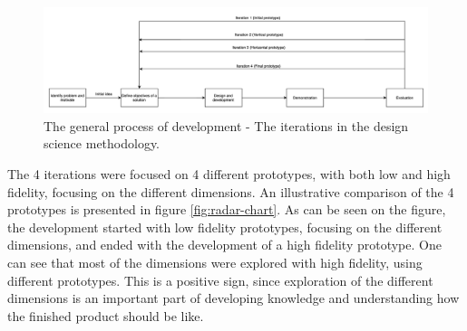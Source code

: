 \documentclass[pdftex,10pt,b5paper,twoside]{report}
\begin{document}
\begin{figure}[h!]
    \centering
    \includegraphics[width=\linewidth]{../images/workflow.png}
    \caption{The general process of development - The iterations in the design science methodology.}
    \label{fig:workflow}
\end{figure}

The 4 iterations were focused on 4 different prototypes, with both low and high fidelity, focusing on the different dimensions. An illustrative comparison of the 4 prototypes is presented in figure \ref{fig:radar-chart}. As can be seen on the figure, the development started with low fidelity prototypes, focusing on the different dimensions, and ended with the development of a high fidelity prototype. One can see that most of the dimensions were explored with high fidelity, using different prototypes. This is a positive sign, since exploration of the different dimensions is an important part of developing knowledge and understanding how the finished product should be like. 
\end{document}
